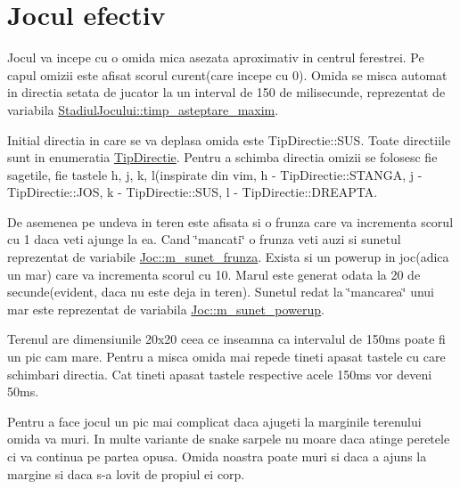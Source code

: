 \hypertarget{group__group__jocul__efectiv}{}\section{Jocul efectiv}
\label{group__group__jocul__efectiv}
Jocul va incepe cu o omida mica asezata aproximativ in centrul ferestrei. Pe capul omizii este afisat scorul curent(care incepe cu 0). Omida se misca automat in directia setata de jucator la un interval de 150 de milisecunde, reprezentat de variabila \hyperlink{classStadiulJocului_a4cdf9582b472e74980e1eee73ca94769}{Stadiul\+Jocului\+::timp\+\_\+asteptare\+\_\+maxim}.

Initial directia in care se va deplasa omida este Tip\+Directie\+::\+S\+US. Toate directiile sunt in enumeratia \hyperlink{main_8cpp_aea66a0d525bf9bfb9b61e9cc1ba0b752}{Tip\+Directie}. Pentru a schimba directia omizii se folosesc fie sagetile, fie tastele h, j, k, l(inspirate din vim, h -\/ Tip\+Directie\+::\+S\+T\+A\+N\+GA, j -\/ Tip\+Directie\+::\+J\+OS, k -\/ Tip\+Directie\+::\+S\+US, l -\/ Tip\+Directie\+::\+D\+R\+E\+A\+P\+TA.

De asemenea pe undeva in teren este afisata si o frunza care va incrementa scorul cu 1 daca veti ajunge la ea. Cand \char`\"{}mancati\char`\"{} o frunza veti auzi si sunetul reprezentat de variabile \hyperlink{classJoc_ac92412a0e2de93936c4c600a7efe45f4}{Joc\+::m\+\_\+sunet\+\_\+frunza}. Exista si un powerup in joc(adica un mar) care va incrementa scorul cu 10. Marul este generat odata la 20 de secunde(evident, daca nu este deja in teren). Sunetul redat la \char`\"{}mancarea\char`\"{} unui mar este reprezentat de variabila \hyperlink{classJoc_aec45d2779304b9ee3ba5c3962a66323b}{Joc\+::m\+\_\+sunet\+\_\+powerup}.

Terenul are dimensiunile 20x20 ceea ce inseamna ca intervalul de 150ms poate fi un pic cam mare. Pentru a misca omida mai repede tineti apasat tastele cu care schimbari directia. Cat tineti apasat tastele respective acele 150ms vor deveni 50ms.

Pentru a face jocul un pic mai complicat daca ajugeti la marginile terenului omida va muri. In multe variante de snake sarpele nu moare daca atinge peretele ci va continua pe partea opusa. Omida noastra poate muri si daca a ajuns la margine si daca s-\/a lovit de propiul ei corp. 